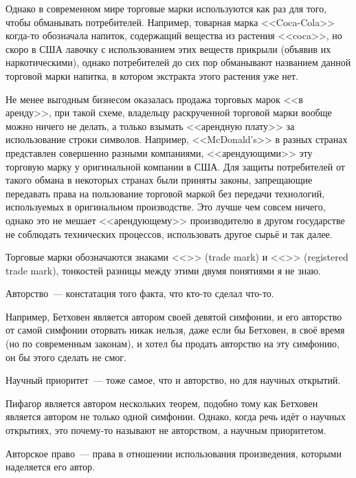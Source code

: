 Однако в современном мире торговые марки используются как раз для того, чтобы обманывать потребителей. 
Например, товарная марка <<Coca-Cola>> когда-то обозначала напиток, содержащий вещества из растения <<coca>>, но скоро в США лавочку с использованием этих веществ прикрыли (объявив их наркотическими), однако потребителей до сих пор обманывают названием данной торговой марки напитка, в котором экстракта этого растения уже нет.

Не менее выгодным бизнесом оказалась продажа торговых марок <<в аренду>>, при такой схеме, владельцу раскрученной торговой марки вообще можно ничего не делать, а только взымать <<арендную плату>> за использование строки символов.
Например, <<McDonald's>> в разных странах представлен совершенно разными компаниями, <<арендующими>> эту торговую марку у оригинальной компании в США.
Для защиты потребителей от такого обмана в некоторых странах были приняты законы, запрещающие передавать права на пользование торговой маркой без передачи технологий, используемых в оригинальном производстве.
Это лучше чем совсем ничего, однако это не мешает <<арендующему>> производителю в другом государстве не соблюдать технических процессов, использовать другое сырьё и так далее.

Торговые марки обозначаются знаками <<\texttrademark>> (trade mark) и <<\textregistered>> (registered trade mark), тонкостей разницы между этими двумя понятиями я не знаю.

\begin{definition}
Авторство~--- констатация того факта, что кто-то сделал что-то.
\end{definition}

Например, Бетховен является автором своей девятой симфонии, и его авторство от самой симфонии оторвать никак нельзя, даже если бы Бетховен, в своё время (но по современным законам), и хотел бы продать авторство на эту симфонию, он бы этого сделать не смог.

\begin{definition}
Научный приоритет~--- тоже самое, что и авторство, но для научных открытий.
\end{definition}

Пифагор является автором нескольких теорем, подобно тому как Бетховен является автором не только одной симфонии.
Однако, когда речь идёт о научных открытиях, это почему-то называют не авторством, а научным приоритетом.

\begin{definition}
Авторское право~--- права в отношении использования произведения, которыми наделяется его автор.
\end{definition}

